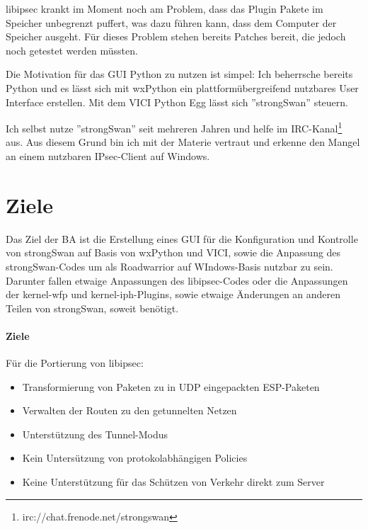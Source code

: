 \documentclass[a4paper]{article}
\begin{document}
libipsec krankt im Moment noch am Problem, dass das Plugin Pakete im Speicher unbegrenzt
puffert, was dazu führen kann, dass dem Computer der Speicher ausgeht. Für dieses
Problem stehen bereits Patches bereit, die jedoch noch getestet werden müssten.

Die Motivation für das \ac{GUI} Python zu nutzen ist simpel: Ich beherrsche bereits
Python und es lässt sich mit wxPython ein plattformübergreifend nutzbares User Interface erstellen.
Mit dem \ac{VICI} Python Egg lässt sich ''strongSwan'' steuern.

Ich selbst nutze ''strongSwan'' seit mehreren Jahren und helfe im \ac{IRC}-Kanal\footnote{irc://chat.frenode.net/strongswan}
aus. Aus diesem Grund bin ich mit der Materie vertraut und erkenne den Mangel an einem
nutzbaren IPsec-Client auf Windows.

\section{Ziele}
Das Ziel der \ac{BA} ist die Erstellung eines \ac{GUI} für die Konfiguration
und Kontrolle von strongSwan auf Basis von wxPython und \ac{VICI}, sowie
die Anpassung des strongSwan-Codes um als Roadwarrior auf WIndows-Basis nutzbar zu sein.
Darunter fallen etwaige Anpassungen des libipsec-Codes oder die Anpassungen der kernel-wfp
und kernel-iph-Plugins, sowie etwaige Änderungen an anderen Teilen von strongSwan, soweit
benötigt.

\paragraph{Ziele}
Für die Portierung von libipsec:
\begin{itemize}
\item Transformierung von Paketen zu in UDP eingepackten ESP-Paketen
\item Verwalten der Routen zu den getunnelten Netzen
\item Unterstützung des Tunnel-Modus
\item Kein Untersützung von protokolabhängigen Policies
\item Keine Unterstützung für das Schützen von Verkehr direkt zum Server
\end{itemize}
\end{document}
